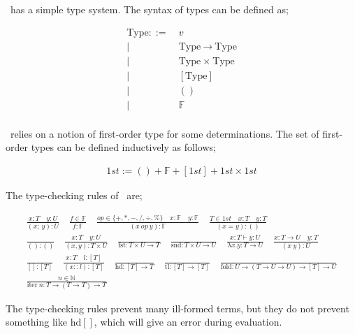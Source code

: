 \documentclass[
    9pt,            %
    techreport,        %
    affiltop,       %
]{art}
\begin{document}
\VampIR{}\ has a simple type system. The syntax of types can be defined as;

\begin{align*}
    \text{Type} ::=&\ v \\
    |\ &\ \text{Type} \ \xrightarrow{} \ \text{Type} \\
    |\ &\ \text{Type} \ \times \ \text{Type} \\
    |\ &\ [\text{Type}] \\
    |\ &\ () \\
    |\ &\ \mathbb{F} \\
\end{align*}

\VampIR{}\ relies on a notion of first-order type for some determinations. The set of first-order types can be defined inductively as follows;

\begin{align*}
    1st := () + \mathbb{F} + [1st] + 1st \times 1st
\end{align*}

The type-checking rules of \VampIR{}\ are;

\begin{align*}
    \frac{x : T \quad y : U}{(x;\ y) : U} \quad
    \frac{f \in \mathbb{F}}{f : \mathbb{F}} \quad
    \frac{op \in \{+, *, -, /, \div, \% \} \quad x : \mathbb{F} \quad y : \mathbb{F} }{(x\ op\ y) : \mathbb{F}} \quad
    \frac{T \in 1st \quad x : T \quad y : T}{(x = y) : ()} \\
    \frac{}{() : ()} \quad
    \frac{x : T \quad y : U}{(x,y) : T \times U} \quad
    \frac{}{\text{fst} : T \times U \rightarrow T} \quad
    \frac{}{\text{snd} : T \times U \rightarrow U}\quad
    \frac{x : T \vdash y : U}{\lambda x.y : T \rightarrow U} \quad
    \frac{x : T \rightarrow U \quad y : T}{(x\ y) : U} \\
    \frac{}{[] : [T]} \quad
    \frac{x : T \quad l : [T]}{(x :: l) : [T]} \quad
    \frac{}{\text{hd} : [T] \rightarrow T} \quad
    \frac{}{\text{tl} : [T] \rightarrow [T]} \quad
    \frac{}{\text{fold} : U \rightarrow (T \rightarrow U \rightarrow U) \rightarrow [T] \rightarrow U} \\
    \frac{n \in \mathbb{N}}{\text{iter}\ n : T \rightarrow (T \rightarrow T) \rightarrow T}
\end{align*}

The type-checking rules prevent many ill-formed terms, but they do not prevent something like $\text{hd} []$, which will give an error during evaluation.
\end{document}

